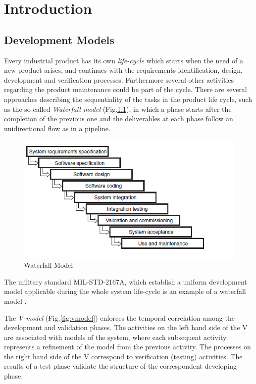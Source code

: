 
\chapter{Introduction}




\section{Development Models}
\label{sec:devmodels}


Every industrial product has its own \textit{life-cycle} which starts when the need of a new product arises, and continues with the requirements identification, design, development and verification processes. Furthermore several other activities regarding the product maintenance could be part of the cycle. There are several approaches describing the sequentiality of the tasks in the product life cycle, such as the so-called \textit{Waterfall model} (Fig.\ref{fig:waterfall}), in which a phase starts after the completion of the previous one and the deliverables at each phase follow an unidirectional flow as in a pipeline.
\begin{figure}[!h]
	\centering 
     \includegraphics[width=.75\textwidth]{Figs/waterfall.png} 
     \caption{Waterfall Model} 
     \label{fig:waterfall} 
\end{figure} 

The military standard MIL-STD-2167A, which establish a uniform development model applicable during the whole system life-cycle is an example of a waterfall model .
\par The \textit{V-model} (Fig.\ref{fig:vmodel}) enforces the temporal correlation among the development and validation phases. The activities on the left hand side of the V are associated with models of the system, where each subsequent activity represents a refinement of the model from the previous activity. The processes on the right hand side of the V correspond to verification (testing) activities. The results of a test phase validate the structure of the correspondent developing phase.


